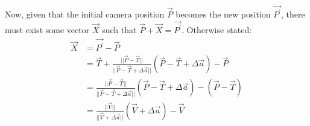 Now, given that the initial camera position $\vec{P}$ becomes the new position $\vec{P^\prime}$, there must exist some vector $\vec{X}$ such that $\vec{P} + \vec{X} = \vec{P^\prime}$. Otherwise stated:
\begin{align}
    \vec{X} &= \vec{P^\prime} - \vec{P}\nonumber\\
    &= \vec{T} + \frac{||\vec{P} - \vec{T}||}{||\vec{P} - \vec{T} + \Delta\vec{a}||}(\vec{P} - \vec{T} + \Delta\vec{a}) - \vec{P}\nonumber\\
    &= \frac{||\vec{P} - \vec{T}||}{||\vec{P} - \vec{T} + \Delta\vec{a}||}(\vec{P} - \vec{T} + \Delta\vec{a}) - (\vec{P} - \vec{T})\nonumber\\
    &= \frac{||\vec{V}||}{||\vec{V} + \Delta\vec{a}||}(\vec{V} + \Delta\vec{a}) - \vec{V}
\end{align}